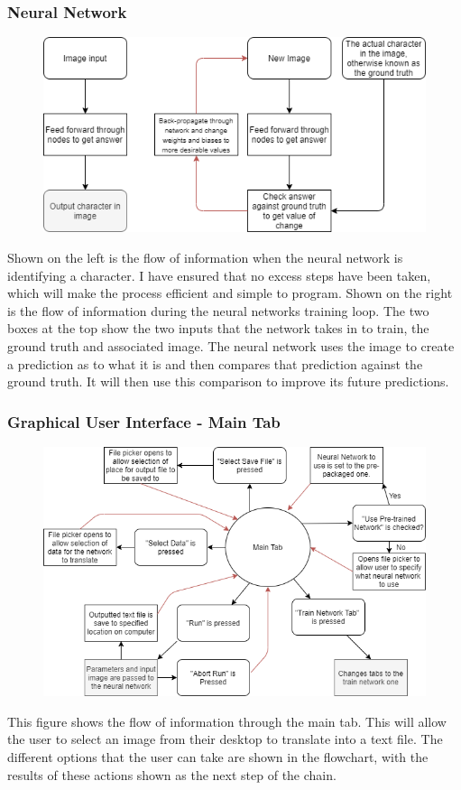 \documentclass{report}
\begin{document}
\subsubsection{Neural Network}
\begin{figure}[H]
    \centering
    \includegraphics[width=12cm]{Images/Structure Of Program/Flow of infomation through neural network.png}
\end{figure}
Shown on the left is the flow of information when the neural network is identifying a character. I have ensured that no excess steps have been taken, which will make the process efficient and simple to program.
\newline
Shown on the right is the flow of information during the neural networks training loop. The two boxes at the top show the two inputs that  the network takes in to train, the ground truth and associated image. The neural network uses the image to create a prediction as to what it is and then compares that prediction against the ground truth. It will then use this comparison to improve its future predictions.

\subsubsection{Graphical User Interface - Main Tab}
\begin{figure}[H]
    \centering
    \includegraphics[width=13cm]{Images/Structure Of Program/Diagram for Main Tab.png}
\end{figure}
This figure shows the flow of information through the main tab. This will allow the user to select an image from their desktop to translate into a text file. The different options that the user can take are shown in the flowchart, with the results of these actions shown as the next step of the chain.
\end{document}

